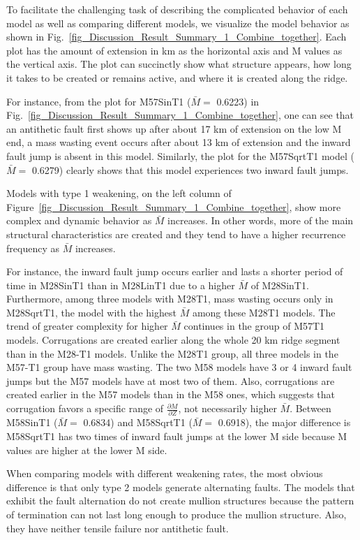 \documentclass[draft,gc]{agutex}
\begin{document}
\begin{article}
To facilitate the challenging task of describing the complicated behavior of each model as well as comparing different models, we visualize the model behavior as shown in Fig.~\ref{fig_Discussion_Result_Summary_1_Combine_together}. Each plot has the amount of extension in km as the horizontal axis and M values as the vertical axis. The plot can succinctly show what structure appears, how long it takes to be created or remains active, and where it is created along the ridge.

For instance, from the plot for M57SinT1 ($\bar{M} =$ 0.6223) in Fig.~\ref{fig_Discussion_Result_Summary_1_Combine_together}, one can see that an antithetic fault first shows up after about 17 km of extension on the low M end, a mass wasting event occurs after about 13 km of extension and the inward fault jump is absent in this model. Similarly, the plot for the M57SqrtT1 model ($\bar{M} =$ 0.6279) clearly shows that this model experiences two inward fault jumps.

Models with type 1 weakening, on the left column of Figure~\ref{fig_Discussion_Result_Summary_1_Combine_together}, show more complex and dynamic behavior as $\bar{M}$ increases. In other words, more of the main structural characteristics are created and they tend to have a higher recurrence frequency as $\bar{M}$ increases.

For instance, the inward fault jump occurs earlier and lasts a shorter period of time in M28SinT1 than in M28LinT1 due to a higher $\bar{M}$ of M28SinT1. Furthermore, among three models with M28T1, mass wasting occurs only in M28SqrtT1, the model with the highest $\bar{M}$ among these M28T1 models. The trend of greater complexity for higher $\bar{M}$ continues in the group of M57T1 models. Corrugations are created earlier along the whole 20 km ridge segment than in the M28-T1 models. Unlike the M28T1 group, all three models in the M57-T1 group have mass wasting. The two M58 models have 3 or 4 inward fault jumps but the M57 models have at most two of them. Also, corrugations are created earlier in the M57 models than in the M58 ones, which suggests that corrugation favors a specific range of $\frac{\partial M}{\partial Z}$, not necessarily higher $\bar{M}$. Between M58SinT1 ($\bar{M} =$ 0.6834) and M58SqrtT1 ($\bar{M} =$ 0.6918), the major difference is M58SqrtT1 has two times of inward fault jumps at the lower M side because M values are higher at the lower M side.

When comparing models with different weakening rates, the most obvious difference is that only type 2 models generate alternating faults. The models that exhibit the fault alternation do not create mullion structures because the pattern of termination can not last long enough to produce the mullion structure. Also, they have neither tensile failure nor antithetic fault.


\end{article}
\end{document}
